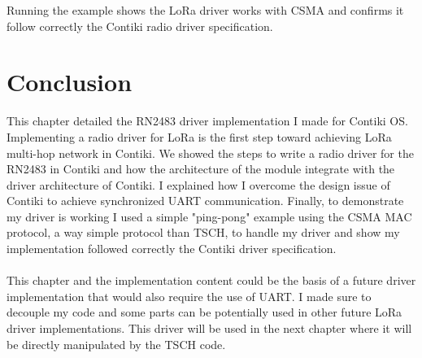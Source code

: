 

Running the example shows the LoRa driver works with CSMA and confirms
it follow correctly the Contiki radio driver specification.

\section{Conclusion}

This chapter detailed the RN2483 driver implementation I made for Contiki OS.
Implementing a radio driver for LoRa is the first step toward achieving LoRa
multi-hop network in Contiki.
We showed the steps to write a radio driver for the RN2483 in Contiki and how
the architecture of the module integrate with the driver architecture of Contiki.
I explained how I overcome the design issue of Contiki to achieve
synchronized UART communication.
Finally, to demonstrate my driver is working I used a simple "ping-pong" example
using the CSMA MAC protocol, a way simple protocol than TSCH, to handle my
driver and show my implementation followed correctly the Contiki driver
specification.

\paragraph{}

This chapter and the implementation content could be the basis of a future
driver implementation that would also require the use of UART.
I made sure to decouple my code and some parts can be potentially used in
other future LoRa driver implementations.
This driver will be used in the next chapter where it will be directly
manipulated by the TSCH code.

